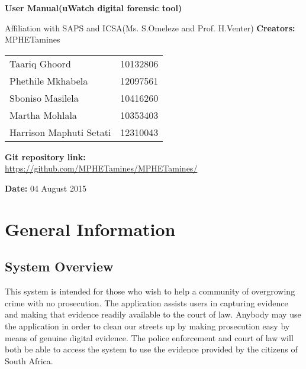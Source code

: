 \documentclass[a4paper,12pt]{article}
\begin{document}
\begin{center}

\Huge\textbf{User Manual(uWatch digital forensic tool)\\}
																											
\vspace{2 cm}
Affiliation with SAPS and ICSA(Ms. S.Omeleze and Prof. H.Venter)\newline 
\vspace{2 cm}
\LARGE\textbf{Creators:} MPHETamines
\begin{tabular}{lr}
Taariq Ghoord&10132806
\\
Phethile Mkhabela&12097561
\\
Sboniso Masilela&10416260
\\ 
Martha Mohlala&10353403
\\
Harrison Maphuti Setati&12310043\\
\end{tabular}

\vspace{1cm}
\textbf{Git repository link:\\}
\url{https://github.com/MPHETamines/MPHETamines/}

\vspace{1cm}
\textbf{Date:} 04 August 2015
\end{center}
\newpage

\tableofcontents

\newpage
{}

\section{General Information}
\subsection{System Overview}
This system is intended for those who wish to help a community of overgrowing crime with no prosecution. The application assists users in capturing evidence and making that evidence readily available to the court of law. Anybody may use the application in order to clean our streets up by making prosecution easy by means of genuine digital evidence. The police enforcement and court of law will both be able to access the system to use the evidence provided by the citizens of South Africa.
\end{document}

